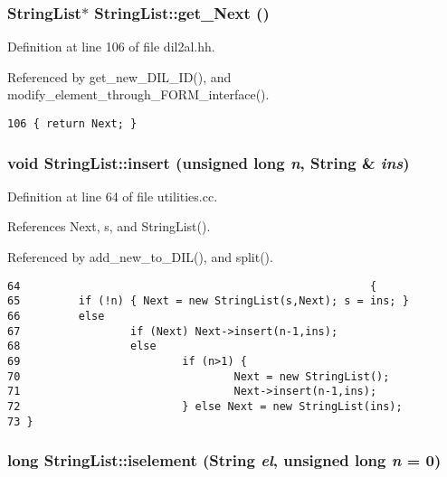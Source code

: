 \subsubsection{\setlength{\rightskip}{0pt plus 5cm}String\-List$\ast$ String\-List::get\_\-Next ()\hspace{0.3cm}{\tt  [inline]}}\label{classStringList_a6}




Definition at line 106 of file dil2al.hh.

Referenced by get\_\-new\_\-DIL\_\-ID(), and modify\_\-element\_\-through\_\-FORM\_\-interface().



\footnotesize\begin{verbatim}106 { return Next; }
\end{verbatim}\normalsize 
{}
\subsubsection{\setlength{\rightskip}{0pt plus 5cm}void String\-List::insert (unsigned long {\em n}, {\bf String} \& {\em ins})}\label{classStringList_a9}




Definition at line 64 of file utilities.cc.

References Next, s, and String\-List().

Referenced by add\_\-new\_\-to\_\-DIL(), and split().



\footnotesize\begin{verbatim}64                                                      {
65         if (!n) { Next = new StringList(s,Next); s = ins; }
66         else
67                 if (Next) Next->insert(n-1,ins);
68                 else 
69                         if (n>1) {
70                                 Next = new StringList();
71                                 Next->insert(n-1,ins);
72                         } else Next = new StringList(ins);
73 }
\end{verbatim}\normalsize 
{}
\subsubsection{\setlength{\rightskip}{0pt plus 5cm}long String\-List::iselement ({\bf String} {\em el}, unsigned long {\em n} = 0)}\label{classStringList_a11}




